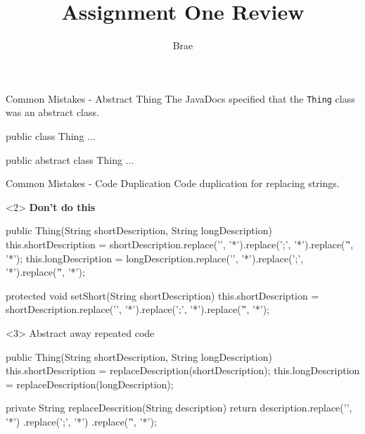 \documentclass[12]{beamer}
\title{Assignment One Review}
\author{Brae}
\institute {CSSE2002: Programming in the Large}
\begin{document}
\begin{frame}
\titlepage
\end{frame}

\begin{frame}[t, fragile]{Common Mistakes - Abstract Thing} \vspace{4pt}
The JavaDocs specified that the \texttt{Thing} class was an abstract class.

\begin{java}
public class Thing {
	...
}

public abstract class Thing {
	...
}
\end{java}
\end{frame}

\begin{frame}[t, fragile]{Common Mistakes - Code Duplication} \vspace{4pt}
Code duplication for replacing strings.

\begin{onlyenv}<2>
\textbf{Don't do this}
\begin{java}
public Thing(String shortDescription, String longDescription) {
    this.shortDescription = shortDescription.replace('\n', '*').replace(';', '*').replace('\r', '*');
    this.longDescription = longDescription.replace('\n', '*').replace(';', '*').replace('\r', '*');
}

protected void setShort(String shortDescription) {
    this.shortDescription = shortDescription.replace('\n', '*').replace(';', '*').replace('\r', '*');
}
\end{java}
\end{onlyenv}

\begin{onlyenv}<3>
Abstract away repeated code
\begin{java}
public Thing(String shortDescription, String longDescription) {
    this.shortDescription = replaceDescription(shortDescription);
    this.longDescription = replaceDescription(longDescription);
}

private String replaceDescrition(String description) {
    return description.replace('\n', '*')
            .replace(';', '*')
            .replace('\r', '*');
}
\end{java}
\end{onlyenv}

\end{frame}
\end{document}
